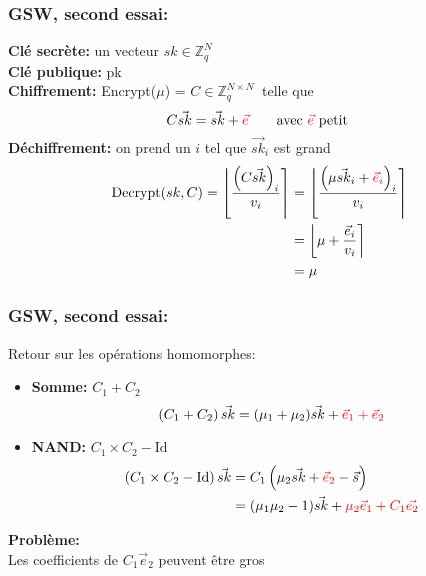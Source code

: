 \documentclass[11pt,xcolor={usenames,dvipsnames}]{beamer}
\newcommand{\ZZq}{\mathbb{Z}_q}
\begin{document}
\begin{frame} 
\frametitle{GSW, second essai:}
\textbf{Clé secrète:} un vecteur $sk \in \ZZq^{N}$ \\
\textbf{Clé publique:} pk\\
\textbf{Chiffrement:} Encrypt($\mu$) = $C\in \ZZq^{N \times N}\:$ telle que  
\[C \vec{sk} = \vec{sk} + {\color{red}\vec{e}}\qquad \text{avec }  {\color{red}\vec{e}} \text{ petit} \]
\textbf{Déchiffrement:} on prend un $i$ tel que $\vec{sk}_i$ est grand
\begin{align*}
\text{Decrypt}(sk, C) = \left\lfloor \frac{{\left(C\vec{sk}\right)}_i}{v_i} \right\rceil &= 
\left\lfloor \frac{{\left(\mu\vec{sk}_i + {\color{red}\vec{e}_i}\right)}_i}{v_i} \right\rceil \\
&= \left\lfloor \mu + \frac{\vec{e}_i}{v_i} \right\rceil \\
&= \mu
\end{align*}
\end{frame} 



\begin{frame} 
\frametitle{GSW, second essai:}
Retour sur les opérations homomorphes:
\begin{itemize}
\item \textbf{Somme:} $C_1 + C_2\quad$
\[\left(C_1 + C_2\right) \vec{sk} = (\mu_1 + \mu_2) \vec{sk} + {\color{red}\vec{e}_1 + \vec{e}_2}\]
\item \textbf{NAND:} $C_1 \times C_2 - \text{Id}$
\begin{align*}
\left(C_1 \times C_2 - \text{Id}\right) \vec{sk} &= C_1\left(\mu_2\vec{sk} + {\color{red}\vec{e}_2} - \vec{s}\right) \\
&= (\mu_1 \mu_2 - 1) \vec{sk} + {\color{red}\mu_2 \vec{e}_1 + C_1 \vec{e_2}}
\end{align*}
\end{itemize}

\textbf{Problème:} \\
Les coefficients de $C_1 \vec{e}_2$ peuvent être gros

\end{frame} 

  
\end{document}
